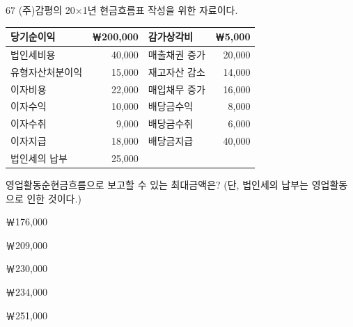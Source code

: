 \begin{question}{67}
(주)감평의 20×1년 현금흐름표 작성을 위한 자료이다.
\par
{\small\centering
\begin{tabular}{|l|r|l|r|}\hline
당기순이익 & ￦200,000 & 감가상각비 & ￦5,000 \\\hline
법인세비용 & 40,000 & 매출채권 증가 & 20,000 \\\hline
유형자산처분이익 & 15,000 & 재고자산 감소 & 14,000 \\\hline
이자비용 & 22,000 & 매입채무 증가 & 16,000 \\\hline
이자수익 & 10,000 & 배당금수익 & 8,000 \\\hline
이자수취 & 9,000 & 배당금수취 & 6,000 \\\hline
이자지급 & 18,000 & 배당금지급 & 40,000 \\\hline
법인세의 납부 & 25,000 & & \\\hline
\end{tabular}\par}
영업활동순현금흐름으로 보고할 수 있는 최대금액은? (단, 법인세의 납부는 영업활동으로 인한 것이다.) \par
\begin{choices}
  \item ￦176,000
  \item ￦209,000
  \item ￦230,000
  \item ￦234,000
  \item ￦251,000
\end{choices}
\end{question}
